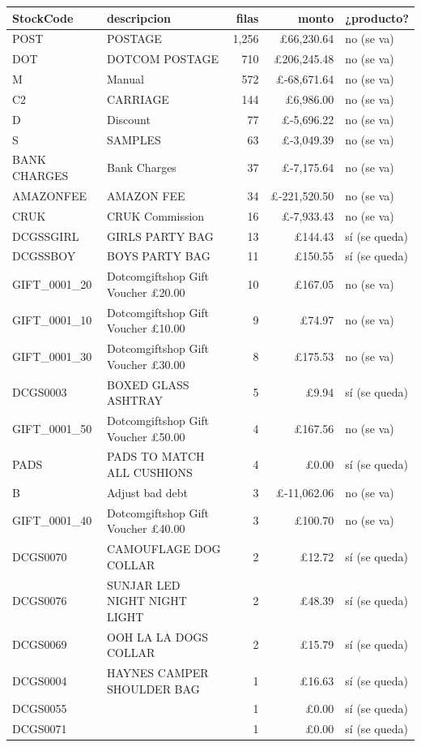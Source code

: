 \begin{tabular}{llrrl}
\toprule
StockCode & descripcion & filas & monto & ¿producto? \\
\midrule
POST & POSTAGE & 1,256 & \pounds{}66,230.64 & no (se va) \\
DOT & DOTCOM POSTAGE & 710 & \pounds{}206,245.48 & no (se va) \\
M & Manual & 572 & \pounds{}-68,671.64 & no (se va) \\
C2 & CARRIAGE & 144 & \pounds{}6,986.00 & no (se va) \\
D & Discount & 77 & \pounds{}-5,696.22 & no (se va) \\
S & SAMPLES & 63 & \pounds{}-3,049.39 & no (se va) \\
BANK CHARGES & Bank Charges & 37 & \pounds{}-7,175.64 & no (se va) \\
AMAZONFEE & AMAZON FEE & 34 & \pounds{}-221,520.50 & no (se va) \\
CRUK & CRUK Commission & 16 & \pounds{}-7,933.43 & no (se va) \\
DCGSSGIRL & GIRLS PARTY BAG & 13 & \pounds{}144.43 & sí (se queda) \\
DCGSSBOY & BOYS PARTY BAG & 11 & \pounds{}150.55 & sí (se queda) \\
GIFT\_0001\_20 & Dotcomgiftshop Gift Voucher \pounds{}20.00 & 10 & \pounds{}167.05 & no (se va) \\
GIFT\_0001\_10 & Dotcomgiftshop Gift Voucher \pounds{}10.00 & 9 & \pounds{}74.97 & no (se va) \\
GIFT\_0001\_30 & Dotcomgiftshop Gift Voucher \pounds{}30.00 & 8 & \pounds{}175.53 & no (se va) \\
DCGS0003 & BOXED GLASS ASHTRAY & 5 & \pounds{}9.94 & sí (se queda) \\
GIFT\_0001\_50 & Dotcomgiftshop Gift Voucher \pounds{}50.00 & 4 & \pounds{}167.56 & no (se va) \\
PADS & PADS TO MATCH ALL CUSHIONS & 4 & \pounds{}0.00 & sí (se queda) \\
B & Adjust bad debt & 3 & \pounds{}-11,062.06 & no (se va) \\
GIFT\_0001\_40 & Dotcomgiftshop Gift Voucher \pounds{}40.00 & 3 & \pounds{}100.70 & no (se va) \\
DCGS0070 & CAMOUFLAGE DOG COLLAR & 2 & \pounds{}12.72 & sí (se queda) \\
DCGS0076 & SUNJAR LED NIGHT NIGHT LIGHT & 2 & \pounds{}48.39 & sí (se queda) \\
DCGS0069 & OOH LA LA DOGS COLLAR & 2 & \pounds{}15.79 & sí (se queda) \\
DCGS0004 & HAYNES CAMPER SHOULDER BAG & 1 & \pounds{}16.63 & sí (se queda) \\
DCGS0055 &  & 1 & \pounds{}0.00 & sí (se queda) \\
DCGS0071 &  & 1 & \pounds{}0.00 & sí (se queda) \\
\bottomrule
\end{tabular}